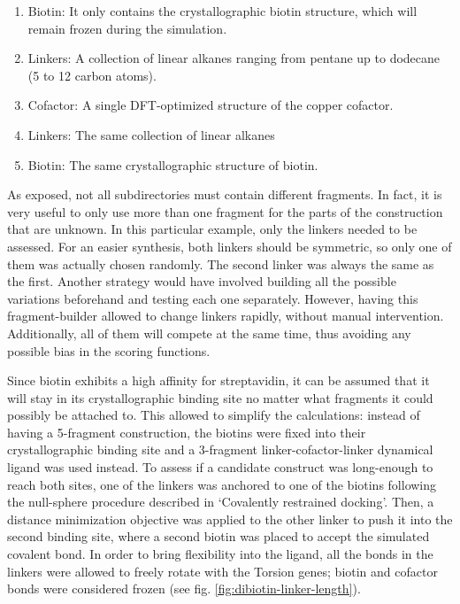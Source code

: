 \begin{enumerate}
	\item Biotin: It only contains the crystallographic biotin structure, which will remain frozen during the simulation.

	\item Linkers: A collection of linear alkanes ranging from pentane up to dodecane (5 to 12 carbon atoms).

	\item Cofactor: A single DFT-optimized structure of the copper cofactor.

	\item Linkers: The same collection of linear alkanes

	\item Biotin: The same crystallographic structure of biotin.
\end{enumerate}

As exposed, not all subdirectories must contain different fragments. In fact, it is very useful to only use more than one fragment for the parts of the construction that are unknown. In this particular example, only the linkers needed to be assessed. For an easier synthesis, both linkers should be symmetric, so only one of them was actually chosen randomly. The second linker was always the same as the first. Another strategy would have involved building all the possible variations beforehand and testing each one separately. However, having this fragment-builder allowed to change linkers rapidly, without manual intervention. Additionally, all of them will compete at the same time, thus avoiding any possible bias in the scoring functions.

Since biotin exhibits a high affinity for streptavidin, it can be assumed that it will stay in its crystallographic binding site no matter what fragments it could possibly be attached to. This allowed to simplify the calculations: instead of having a 5-fragment construction, the biotins were fixed into their crystallographic binding site and a 3-fragment linker-cofactor-linker dynamical ligand was used instead. To assess if a candidate construct was long-enough to reach both sites, one of the linkers was anchored to one of the biotins following the null-sphere procedure described in ‘Covalently restrained docking’. 
Then, a distance minimization objective was applied to the other linker to push it into the second binding site, where a second biotin was placed to accept the simulated covalent bond. In order to bring flexibility into the ligand, all the bonds in the linkers were allowed to freely rotate with the Torsion genes; biotin and cofactor bonds were considered frozen (see fig. \ref{fig:dibiotin-linker-length}).





